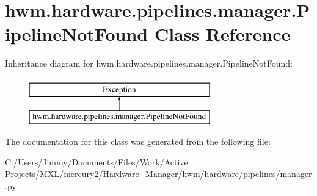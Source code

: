 \hypertarget{classhwm_1_1hardware_1_1pipelines_1_1manager_1_1_pipeline_not_found}{\section{hwm.\-hardware.\-pipelines.\-manager.\-Pipeline\-Not\-Found Class Reference}
\label{classhwm_1_1hardware_1_1pipelines_1_1manager_1_1_pipeline_not_found}
}
Inheritance diagram for hwm.\-hardware.\-pipelines.\-manager.\-Pipeline\-Not\-Found\-:\begin{figure}[H]
\begin{center}
\leavevmode
\includegraphics[height=2.000000cm]{classhwm_1_1hardware_1_1pipelines_1_1manager_1_1_pipeline_not_found}
\end{center}
\end{figure}


The documentation for this class was generated from the following file\-:\begin{DoxyCompactItemize}
\item 
C\-:/\-Users/\-Jimmy/\-Documents/\-Files/\-Work/\-Active Projects/\-M\-X\-L/mercury2/\-Hardware\-\_\-\-Manager/hwm/hardware/pipelines/manager.\-py\end{DoxyCompactItemize}
